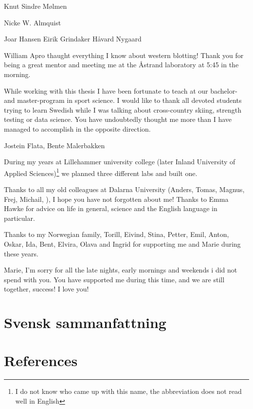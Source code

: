 \documentclass[twoside,10pt]{gihclass} %
\begin{document}
Knut Sindre Mølmen

Nicke W. Almquist

Joar Hansen
Eirik Grindaker
Håvard Nygaard

William Apro thaught everything I know about western blotting! Thank you for being a great mentor and meeting me at the Åstrand laboratory at 5:45 in the morning.

While working with this thesis I have been fortunate to teach at our bachelor- and master-program in sport science. I would like to thank all devoted students trying to learn Swedish while I was talking about cross-country skiing, strength testing or data science. You have undoubtedly thought me more than I have managed to accomplish in the opposite direction.

Jostein Flata, Bente Malerbakken

During my years at Lillehammer university college (later Inland University of Applied Sciences)\footnote{I do not know who came up with this name, the abbreviation does not read well in English} we planned three different labs and built one.

Thanks to all my old colleagues at Dalarna University (Anders, Tomas, Magnus, Frej, Michail, ), I hope you have not forgotten about me! Thanks to Emma Hawke for advice on life in general, science and the English language in particular.

Thanks to my Norwegian family, Torill, Eivind, Stina, Petter, Emil, Anton, Oskar, Ida, Bent, Elvira, Olava and Ingrid for supporting me and Marie during these years.

Marie, I'm sorry for all the late nights, early mornings and weekends i did not spend with you. You have supported me during this time, and we are still together, success! I love you!

\hypertarget{svensk-sammanfattning}{%
\chapter{Svensk sammanfattning}\label{svensk-sammanfattning}}

\backmatter

\hypertarget{references}{%
\chapter*{References}\label{references}}

\twocolumn
\end{document}
